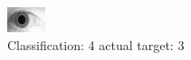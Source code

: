 \begin{figure}[h!]
\begin{center}
\includegraphics[width=0.60\columnwidth]{figures/ID1848_class_4_target_3.png}
\end{center}
\caption{ Classification: 4 actual target: 3}
\label{fig:ID1848_class_4_target_3}
\end{figure}
